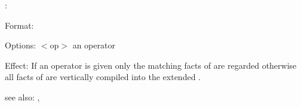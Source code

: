 :

Format: 

Options: $<$op$>$ an operator

Effect: If an operator is given only the matching facts of  are
	regarded otherwise all facts of  are vertically compiled 
	into the extended \WAM{}.

see also: , 
